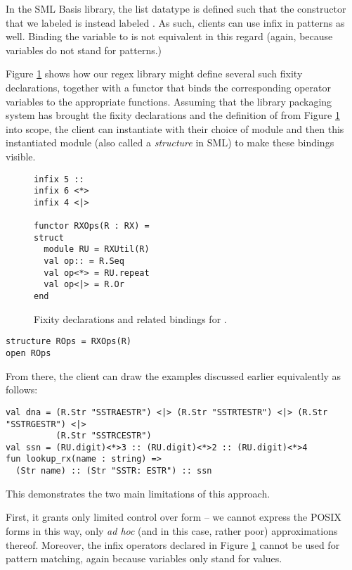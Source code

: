 In the SML Basis library, the list datatype is defined such that the constructor that we labeled  is instead labeled . As such, clients can use infix \li{::} in patterns as well. Binding the variable  to  is not equivalent in this regard (again, because variables do not stand for patterns.)

Figure \ref{fig:infix-RX} shows how our regex library might define several such fixity declarations, together with a functor  that binds the corresponding operator variables to the appropriate functions. Assuming that the library packaging system has brought the fixity declarations and the definition of  from Figure \ref{fig:infix-RX} into scope, the client can instantiate  with their choice of module  and then  this instantiated module (also called a \emph{structure} in SML) to make these bindings visible. 


\begin{figure}
\begin{lstlisting}
infix 5 ::
infix 6 <*>
infix 4 <|>

functor RXOps(R : RX) =
struct 
  module RU = RXUtil(R)
  val op:: = R.Seq
  val op<*> = RU.repeat
  val op<|> = R.Or
end
\end{lstlisting}
\caption{Fixity declarations and related bindings for .}
\label{fig:infix-RX}
\end{figure}
\begin{lstlisting}[numbers=none]
structure ROps = RXOps(R)
open ROps
\end{lstlisting}
From there, the client can draw the examples discussed earlier equivalently as follows:
\begin{lstlisting}[numbers=none]
val dna = (R.Str "SSTRAESTR") <|> (R.Str "SSTRTESTR") <|> (R.Str "SSTRGESTR") <|> 
          (R.Str "SSTRCESTR")
val ssn = (RU.digit)<*>3 :: (RU.digit)<*>2 :: (RU.digit)<*>4
fun lookup_rx(name : string) => 
  (Str name) :: (Str "SSTR: ESTR") :: ssn
\end{lstlisting}

This demonstrates the two main limitations of this approach. 

First, it grants only limited control over form -- we cannot express the POSIX forms in this way, only \emph{ad hoc} (and in this case, rather poor) approximations thereof. Moreover, the infix operators declared in Figure \ref{fig:infix-RX} cannot be used for pattern matching, again because variables only stand for values.%

